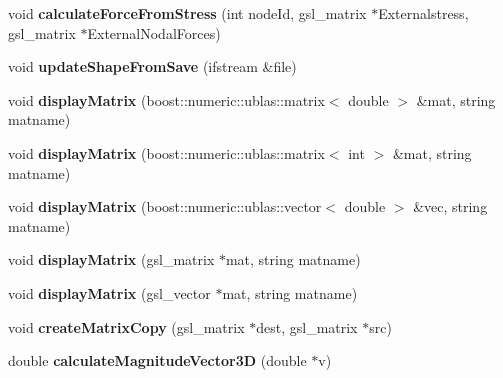 \begin{DoxyCompactItemize}
\item 
\hypertarget{classShapeBase_a6a9f16ddb320974584323d78ca4aec9c}{}void {\bfseries calculate\+Force\+From\+Stress} (int node\+Id, gsl\+\_\+matrix $\ast$Externalstress, gsl\+\_\+matrix $\ast$External\+Nodal\+Forces)\label{classShapeBase_a6a9f16ddb320974584323d78ca4aec9c}

\item 
\hypertarget{classShapeBase_ae5a4fc509efc12d24cf90ea71dee3c27}{}void {\bfseries update\+Shape\+From\+Save} (ifstream \&file)\label{classShapeBase_ae5a4fc509efc12d24cf90ea71dee3c27}

\item 
\hypertarget{classShapeBase_a488d30bfef98b1f1786d8d2b8ec17b99}{}void {\bfseries display\+Matrix} (boost\+::numeric\+::ublas\+::matrix$<$ double $>$ \&mat, string matname)\label{classShapeBase_a488d30bfef98b1f1786d8d2b8ec17b99}

\item 
\hypertarget{classShapeBase_a32973247ffcf77c2fd03f5d00c9fda42}{}void {\bfseries display\+Matrix} (boost\+::numeric\+::ublas\+::matrix$<$ int $>$ \&mat, string matname)\label{classShapeBase_a32973247ffcf77c2fd03f5d00c9fda42}

\item 
\hypertarget{classShapeBase_ae121abd34a8206b1f6e6829987ddf5c6}{}void {\bfseries display\+Matrix} (boost\+::numeric\+::ublas\+::vector$<$ double $>$ \&vec, string matname)\label{classShapeBase_ae121abd34a8206b1f6e6829987ddf5c6}

\item 
\hypertarget{classShapeBase_a51b06b089203d187455c97065ad57499}{}void {\bfseries display\+Matrix} (gsl\+\_\+matrix $\ast$mat, string matname)\label{classShapeBase_a51b06b089203d187455c97065ad57499}

\item 
\hypertarget{classShapeBase_af9a10295e67e1f9047d0800ec6b30b0c}{}void {\bfseries display\+Matrix} (gsl\+\_\+vector $\ast$mat, string matname)\label{classShapeBase_af9a10295e67e1f9047d0800ec6b30b0c}

\item 
\hypertarget{classShapeBase_a4b37ec963a6078a7e03512d23470c257}{}void {\bfseries create\+Matrix\+Copy} (gsl\+\_\+matrix $\ast$dest, gsl\+\_\+matrix $\ast$src)\label{classShapeBase_a4b37ec963a6078a7e03512d23470c257}

\item 
\hypertarget{classShapeBase_ac5d2cfe341eceb73f39d90955356f7b8}{}double {\bfseries calculate\+Magnitude\+Vector3\+D} (double $\ast$v)\label{classShapeBase_ac5d2cfe341eceb73f39d90955356f7b8}


\end{DoxyCompactItemize}
